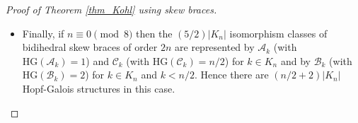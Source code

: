 \documentclass[reqno]{amsart}
\theoremstyle{definition}
\begin{document}
\begin{proof}[Proof of Theorem \ref{thm_Kohl} using skew braces]
\begin{itemize}
\item Finally, if $ n \equiv 0 \pmod{8} $ then the $ (5/2)|K_{n}| $ isomorphism classes of bidihedral skew braces of order $ 2n $ are represented by $ \mathscr{A}_{k} $ (with $ \mathrm{HG}(\mathscr{A}_{k})=1$) and $ \mathscr{C}_{k} $ (with $ \mathrm{HG}(\mathscr{C}_{k})= n/2 $) for $ k \in K_{n} $  and by $ \mathscr{B}_{k} $ (with $ \mathrm{HG}(\mathscr{B}_{k})= 2 $) for $ k \in K_{n} $ and $ k < n/2 $. Hence there are $ (n/2+2)|K_{n}| $ Hopf-Galois structures in this case. 
\end{itemize}

\end{proof}








\end{document}
